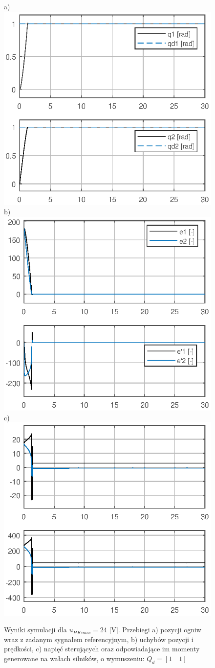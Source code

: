 \documentclass[12pt, a4paper, polish]{article}
\begin{document}
	\begin{figure}[H]\centering
		a) \includegraphics[width=0.30\columnwidth]{SRManL4_ZADANIE2/figs/02Pozycje_U24} b)\includegraphics[width=0.30\columnwidth]{SRManL4_ZADANIE2/figs/02Uchyby_U24} c)\includegraphics[width=0.30\columnwidth]{SRManL4_ZADANIE2/figs/02Sygnaly_U24}\caption{
			Wyniki symulacji dla $u_{HKmax}=24$ [V]. Przebiegi a) pozycji ogniw wraz z zadanym sygnałem referencyjnym, b) uchybów pozycji i prędkości, c)  napięć sterujących oraz odpowiadające im momenty generowane na wałach silników, o wymuszeniu: $Q_d=[1\quad1]$}
	\end{figure}
\end{document}
